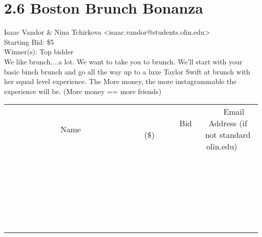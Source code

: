 \documentclass[11pt]{article}
\begin{document}
					\section*{2.6 Boston Brunch Bonanza}
					Isaac Vandor \& Nina Tchirkova <isaac.vandor@students.olin.edu> \\
					Starting Bid: \$5 \\
					Winner(s): Top bidder \\
					We like brunch....a lot. We want to take you to brunch. We'll start with your basic binch brunch and go all the way up to a luxe Taylor Swift at brunch with her squad level experience. The More money, the more instagrammable the experience will be. (More money == more friends) \\
					[6ex]
					\begin{tabular}{c c c}
						~~~~~~~~~~~~~Name~~~~~~~~~~~~~ & ~~~~~~~~~Bid (\$)~~~~~~~~~ & ~~~Email Address (if not standard olin.edu)~~~ \\
				
 & & \\
\hline
 & & \\
\hline
 & & \\
\hline
 & & \\
\hline
 & & \\
\hline
 & & \\
\hline
 & & \\
\hline
 & & \\
\hline
 & & \\
\hline
 & & \\
\hline
 & & \\
\hline
 & & \\
\hline
 & & \\
\hline
 & & \\
\hline
 & & \\
\hline
 & & \\
\hline
 & & \\
\hline
 & & \\
\hline
 & & \\
\hline
 & & \\
\hline
 & & \\
\hline
 & & \\
\hline
 & & \\
\hline
 & & \\
\hline
 & & \\
\hline
 & & \\
\hline
					\end{tabular}
					\clearpage
				
\end{document}
